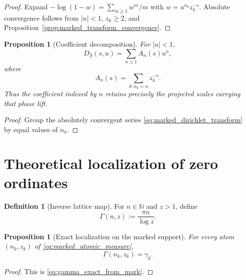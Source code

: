 \documentclass[11pt]{amsart}
\numberwithin{equation}{section}
\theoremstyle{plain}
\newtheorem{proposition}[theorem]{Proposition}
\theoremstyle{definition}
\newtheorem{definition}[theorem]{Definition}
\theoremstyle{remark}
\newcommand{\ZP}{\mathfrak Z}
\newcommand{\N}{\mathbb N}
\begin{document}
\begin{proof}
Expand $-\log(1-w)=\sum_{m\geq1}w^m/m$ with
$w=u^{n_k}z_k^{-s}$.  Absolute convergence follows from
$|u|<1$, $z_k\geq2$, and Proposition~\ref{prop:marked_transform_convergence}.
\end{proof}

\begin{proposition}[Coefficient decomposition]
\label{prop:coefficient_decomposition}
For $|u|<1$,
\begin{equation}
 D_{\ZP}(s,u)=\sum_{n\geq1}A_n(s)u^n,
 \label{eq:marked_power_series}
\end{equation}
where
\begin{equation}
 A_n(s)=\sum_{k:n_k=n}z_k^{-s}.
 \label{eq:marked_coefficient_dirichlet_series}
\end{equation}
Thus the coefficient indexed by $n$ retains precisely the projected scales
carrying that phase lift.
\end{proposition}

\begin{proof}
Group the absolutely convergent series
\eqref{eq:marked_dirichlet_transform} by equal values of $n_k$.
\end{proof}

\section{Theoretical localization of zero ordinates}
\label{sec:theoretical_localization}

\begin{definition}[Inverse lattice map]
\label{def:inverse_lattice_map}
For $n\in\N$ and $z>1$, define
\begin{equation}
 \Gamma(n,z):=\frac{\pi n}{\log z}.
 \label{eq:inverse_lattice_map}
\end{equation}
\end{definition}

\begin{proposition}[Exact localization on the marked support]
\label{prop:exact_localization_support}
For every atom $(n_k,z_k)$ of \eqref{eq:marked_atomic_measure},
\begin{equation}
 \Gamma(n_k,z_k)=\gamma_k.
 \label{eq:exact_localization_identity}
\end{equation}
\end{proposition}

\begin{proof}
This is \eqref{eq:gamma_exact_from_mark}.
\end{proof}
\end{document}
